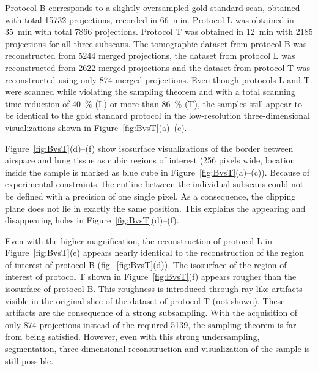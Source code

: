 Protocol B corresponds to a slightly oversampled gold standard scan, obtained with total 15732 projections, recorded in \SI{66}{\minute}. Protocol L was obtained in \SI{35}{\minute} with total 7866 projections. Protocol T was obtained in \SI{12}{\minute} with 2185 projections for all three subscans. The tomographic dataset from protocol B was reconstructed from 5244 merged projections, the dataset from protocol L was reconstructed from 2622 merged projections and the dataset from protocol T was reconstructed using only 874 merged projections. Even though protocols L and T were scanned while violating the sampling theorem and with a total scanning time reduction of \SI{40}{\percent} (L) or more than \SI{86}{\percent} (T), the samples still appear to be identical to the gold standard protocol in the low-resolution three-dimensional visualizations shown in Figure~\ref{fig:BvsT}(a)--(c).

Figure~\ref{fig:BvsT}(d)--(f) show isosurface visualizations of the border between airspace and lung tissue as cubic regions of interest (256 pixels wide, location inside the sample is marked as blue cube in Figure~\ref{fig:BvsT}(a)--(c)). Because of experimental constraints, the cutline between the individual subscans could not be defined with a precision of one single pixel. As a consequence, the clipping plane does not lie in exactly the same position. This explains the appearing and disappearing holes in Figure~\ref{fig:BvsT}(d)--(f).

Even with the higher magnification, the reconstruction of protocol L in Figure~\ref{fig:BvsT}(e) appears nearly identical to the reconstruction of the region of interest of protocol B (fig.~\ref{fig:BvsT}(d)). The isosurface of the region of interest of protocol T shown in Figure~\ref{fig:BvsT}(f) appears rougher than the isosurface of protocol B. This roughness is introduced through ray-like artifacts visible in the original slice of the dataset of protocol T (not shown). These artifacts are the consequence of a strong subsampling. With the acquisition of only 874 projections instead of the required 5139, the sampling theorem is far from being satisfied. However, even with this strong undersampling, segmentation, three-dimensional reconstruction and visualization of the sample is still possible.

